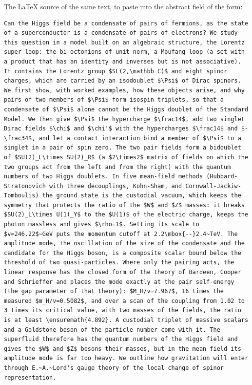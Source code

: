 \documentclass[11pt]{article}
\begin{document}
The LaTeX source of the same text, to paste into the abstract field of the form:

\begin{lstlisting}
Can the Higgs field be a condensate of pairs of fermions, as the state of a superconductor is a condensate of pairs of electrons? We study this question in a model built on an algebraic structure, the Lorentz super-loop: the bi-octonions of unit norm, a Moufang loop (a set with a product that has an identity and inverses but is not associative). It contains the Lorentz group $SL(2,\mathbb C)$ and eight spinor charges, which are carried by an isodoublet $\Psi$ of Dirac spinors. We first show, with worked examples, how these objects arise, and why pairs of two members of $\Psi$ form isospin triplets, so that a condensate of $\Psi$ alone cannot be the Higgs doublet of the Standard Model. We then give $\Psi$ the hypercharge $\frac14$, add two singlet Dirac fields $\chi$ and $\chi'$ with the hypercharges $\frac14$ and $-\frac34$, and let a contact interaction bind a member of $\Psi$ to a singlet in a pair of spin zero. The two pair fields form a bidoublet of $SU(2)_L\times SU(2)_R$ (a $2\times2$ matrix of fields on which the two groups act from the left and from the right) with the quantum numbers of two Higgs doublets. In five mean-field methods (Hubbard-Stratonovich with three decouplings, Kohn-Sham, and Cornwall-Jackiw-Tomboulis) the ground state is the custodial vacuum, which keeps the symmetry that protects the ratio of the $W$ and $Z$ masses: it breaks $SU(2)_L\times U(1)_Y$ to the $U(1)$ of the electric charge, keeps the photon massless and gives $\rho=1$. Setting its scale to $v=246.22$~GeV puts the momentum cutoff at 2.2\mbox{--}2.4~TeV. The amplitude mode, the oscillation of the size of the condensate and the candidate for the Higgs boson, is a composite scalar bound below the threshold of two quasi-particles. Where only the pairing acts, the linear response has the closed form of the theory of Bardeen, Cooper and Schrieffer and places the mode exactly at the pair self-energy (the gap parameter of that theory): $M_H/v=7.967$, 16 times the measured $m_H/v=0.5082$, and over a scan of the coupling from 1.02 to 3 times its critical value, with two masses of the fields, the ratio is at least \ensuremath{4.892}. A custodial triplet of massive scalars and a Goldstone boson of the particle number come with it. The superfluid therefore has the quantum numbers of the Higgs field and gives the $W$ and $Z$ bosons their masses, but in the mean field its amplitude mode is far too heavy. We outline how gravitation will enter through E.~A.~Lord's gauge theory of the local change of spinor representation.
\end{lstlisting}
\end{document}
